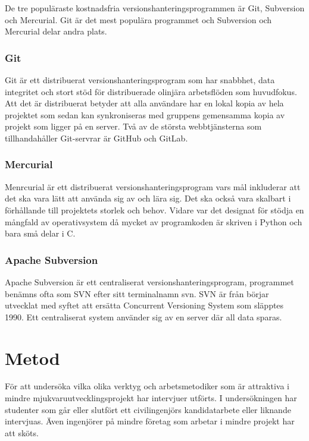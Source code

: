 De tre populäraste kostnadsfria versionshanteringsprogrammen är Git, Subversion och Mercurial. Git är det mest populära programmet och Subversion och Mercurial delar andra plats.\cite{version_comp}
\subsubsection{Git}
Git är ett distribuerat versionshanteringsprogram som har snabbhet, data integritet och stort stöd för distribuerade olinjära arbetsflöden som huvudfokus. Att det är distribuerat betyder att alla användare har en lokal kopia av hela projektet som sedan kan synkroniseras med gruppens gemensamma kopia av projekt som ligger på en server. Två av de största webbtjänsterna som tillhandahåller Git-servrar är GitHub och GitLab.\cite{VersionControlGit}\cite{web_Git}

\subsubsection{Mercurial}
Menrcurial är ett distribuerat versionshanteringsprogram vars mål inkluderar att det ska vara lätt att använda sig av och lära sig. Det ska också vara skalbart i förhållande till projektets storlek och behov. Vidare var det designat för stödja en mångfald av operativsystem då mycket av programkoden är skriven i Python och bara små delar i C.
\cite{VersionControlMercurial}\cite{VersionControlMercurial}


\subsubsection{Apache Subversion}
Apache Subversion är ett centraliserat versionshanteringsprogram, programmet benämns ofta som SVN efter sitt terminalnamn svn. SVN är från börjar utvecklat med syftet att ersätta Concurrent Versioning System som släpptes 1990. Ett centraliserat system använder sig av en server där all data sparas.\cite{wiki_cvs}\cite{VersionControlSvn}\cite{web_Svn}


\section{Metod}
För att undersöka vilka olika verktyg och arbetsmetodiker som är attraktiva i mindre mjukvaruutvecklingsprojekt har intervjuer utförts. I undersökningen har studenter som går eller slutfört ett civilingenjörs kandidatarbete eller liknande intervjuas. Även ingenjörer på mindre företag som arbetar i mindre projekt har att sköts.

